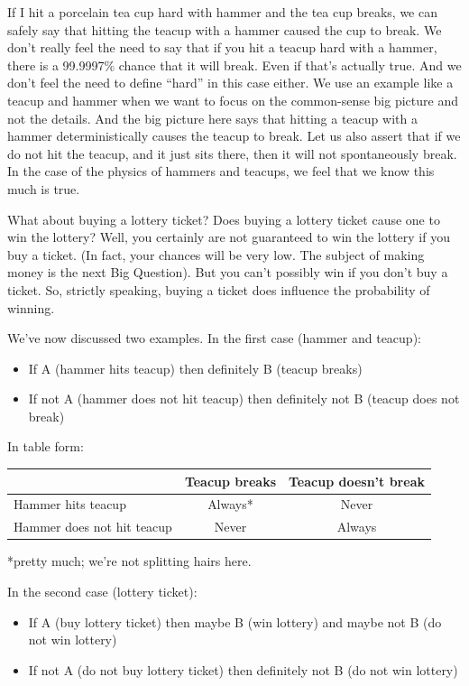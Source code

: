 \documentclass[
  openany]{book}
\providecommand{\tightlist}{%
  \setlength{\itemsep}{0pt}\setlength{\parskip}{0pt}}
\begin{document}
If I hit a porcelain tea cup hard with hammer and the tea cup breaks, we can safely say that hitting the teacup with a hammer caused the cup to break. We don't really feel the need to say that if you hit a teacup hard with a hammer, there is a 99.9997\% chance that it will break. Even if that's actually true. And we don't feel the need to define ``hard'' in this case either. We use an example like a teacup and hammer when we want to focus on the common-sense big picture and not the details. And the big picture here says that hitting a teacup with a hammer deterministically causes the teacup to break. Let us also assert that if we do not hit the teacup, and it just sits there, then it will not spontaneously break. In the case of the physics of hammers and teacups, we feel that we know this much is true.

What about buying a lottery ticket? Does buying a lottery ticket cause one to win the lottery? Well, you certainly are not guaranteed to win the lottery if you buy a ticket. (In fact, your chances will be very low. The subject of making money is the next Big Question). But you can't possibly win if you don't buy a ticket. So, strictly speaking, buying a ticket does influence the probability of winning.

We've now discussed two examples. In the first case (hammer and teacup):

\begin{itemize}
\tightlist
\item
  If A (hammer hits teacup) then definitely B (teacup breaks)
\item
  If not A (hammer does not hit teacup) then definitely not B (teacup does not break)
\end{itemize}

In table form:

\begin{longtable}[]{@{}lcc@{}}
\toprule()
& Teacup breaks & Teacup doesn't break \\
\midrule()
\endhead
Hammer hits teacup & Always* & Never \\
Hammer does not hit teacup & Never & Always \\
\bottomrule()
\end{longtable}

*pretty much; we're not splitting hairs here.

In the second case (lottery ticket):

\begin{itemize}
\tightlist
\item
  If A (buy lottery ticket) then maybe B (win lottery) and maybe not B (do not win lottery)
\item
  If not A (do not buy lottery ticket) then definitely not B (do not win lottery)
\end{itemize}
\end{document}
